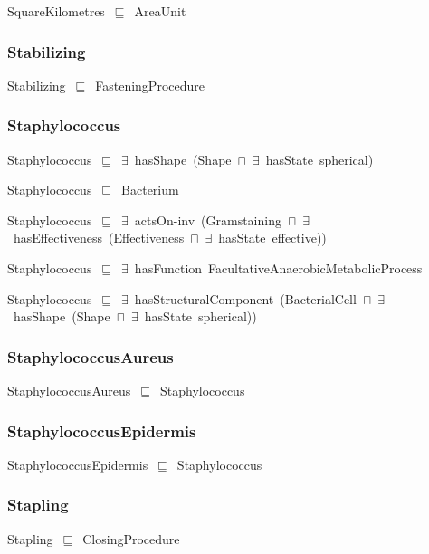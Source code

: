 \documentclass{article}
\begin{document}
SquareKilometres~\ensuremath{\sqsubseteq}~AreaUnit~

\subsubsection*{Stabilizing}

Stabilizing~\ensuremath{\sqsubseteq}~FasteningProcedure~

\subsubsection*{Staphylococcus}

Staphylococcus~\ensuremath{\sqsubseteq}~\ensuremath{\exists}~hasShape~(Shape~\ensuremath{\sqcap}~\ensuremath{\exists}~hasState~spherical)~

Staphylococcus~\ensuremath{\sqsubseteq}~Bacterium~

Staphylococcus~\ensuremath{\sqsubseteq}~\ensuremath{\exists}~actsOn-inv~(Gramstaining~\ensuremath{\sqcap}~\ensuremath{\exists}~hasEffectiveness~(Effectiveness~\ensuremath{\sqcap}~\ensuremath{\exists}~hasState~effective))~

Staphylococcus~\ensuremath{\sqsubseteq}~\ensuremath{\exists}~hasFunction~FacultativeAnaerobicMetabolicProcess~

Staphylococcus~\ensuremath{\sqsubseteq}~\ensuremath{\exists}~hasStructuralComponent~(BacterialCell~\ensuremath{\sqcap}~\ensuremath{\exists}~hasShape~(Shape~\ensuremath{\sqcap}~\ensuremath{\exists}~hasState~spherical))~

\subsubsection*{StaphylococcusAureus}

StaphylococcusAureus~\ensuremath{\sqsubseteq}~Staphylococcus~

\subsubsection*{StaphylococcusEpidermis}

StaphylococcusEpidermis~\ensuremath{\sqsubseteq}~Staphylococcus~

\subsubsection*{Stapling}

Stapling~\ensuremath{\sqsubseteq}~ClosingProcedure~
\end{document}
